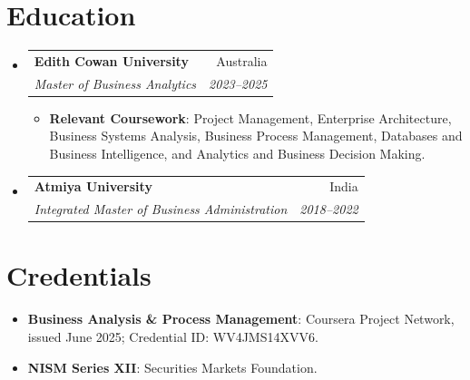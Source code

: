 \documentclass[letterpaper,9.5pt]{article}
\makeatletter
\newcommand{\resumeItem}[2]{
  \item\small{
    \textbf{#1}{: #2 \vspace{-2pt}}
  }
}
\newcommand{\resumeSubheading}[4]{
  \vspace{-1pt}\item
    \begin{tabular*}{0.97\textwidth}{l@{\extracolsep{\fill}}r}
      \textbf{#1} & #2 \\
      \textit{\small #3} & \textit{\small #4} \\
    \end{tabular*}\vspace{-5pt}
}
\newcommand{\resumeSubItem}[2]{\resumeItem{#1}{#2}\vspace{-4pt}}
\newcommand{\resumeSubHeadingListStart}{\begin{itemize}[leftmargin=*]}
\newcommand{\resumeSubHeadingListEnd}{\end{itemize}}
\newcommand{\resumeItemListStart}{\begin{itemize}}
\newcommand{\resumeItemListEnd}{\end{itemize}\vspace{-5pt}}
\makeatother
\begin{document}
\section{Education}
\resumeSubHeadingListStart
  \resumeSubheading
    {Edith Cowan University}{Australia}
    {Master of Business Analytics}{2023--2025}
    \resumeItemListStart
      \resumeItem{Relevant Coursework}
        {Project Management, Enterprise Architecture, Business Systems Analysis, Business Process Management, Databases and Business Intelligence, and Analytics and Business Decision Making.}
    \resumeItemListEnd
  \resumeSubheading
    {Atmiya University}{India}
    {Integrated Master of Business Administration}{2018--2022}
\resumeSubHeadingListEnd

\section{Credentials}
\resumeSubHeadingListStart
  \resumeSubItem{Business Analysis \& Process Management}
    {Coursera Project Network, issued June 2025; Credential ID: WV4JMS14XVV6.}
  \resumeSubItem{NISM Series XII}
    {Securities Markets Foundation.}
\resumeSubHeadingListEnd
\end{document}
